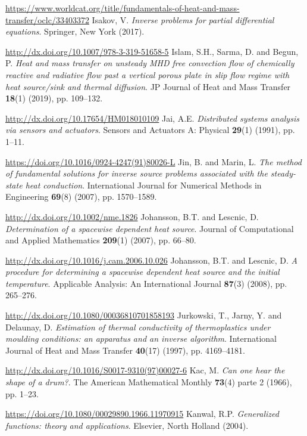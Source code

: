 \begin{thebibliography}{301}
\href{https://www.worldcat.org/title/fundamentals-of-heat-and-mass-transfer/oclc/33403372}{https://www.worldcat.org/title/fundamentals-of-heat-and-mass-transfer/oclc/33403372}
%
%
 Isakov, V. {\it Inverse problems for partial differential equations}. Springer, New York (2017).

\url{http://dx.doi.org/10.1007/978-3-319-51658-5}
%
%
 Islam, S.H., Sarma, D. and Begun, P. {\it Heat and mass transfer on unsteady MHD free convection flow of chemically reactive and radiative flow past a vertical porous plate in slip flow regime with heat source/sink and thermal diffusion}. JP Journal of Heat and Mass Transfer {\bf 18}(1) (2019), pp. 109--132.

\url{http://dx.doi.org/10.17654/HM018010109}
%
%
 Jai, A.E. {\it Distributed systems analysis via sensors and actuators}. Sensors and Actuators A: Physical {\bf 29}(1) (1991), pp. 1--11.

\url{https://doi.org/10.1016/0924-4247(91)80026-L}
%
%
 Jin, B. and Marin, L. {\it The method of fundamental solutions for inverse source problems associated with the steady-state heat conduction}. International Journal for Numerical Methods in Engineering {\bf 69}(8) (2007), pp. 1570--1589.

\url{http://dx.doi.org/10.1002/nme.1826}
%
%
 Johansson, B.T. and Lescnic, D. {\it Determination of a spacewise dependent heat source}. Journal of Computational and Applied Mathematics {\bf 209}(1) (2007), pp. 66--80.

\url{http://dx.doi.org/10.1016/j.cam.2006.10.026}
%
%
 Johansson, B.T. and Lescnic, D. {\it A procedure for determining a spacewise dependent heat source and the initial temperature}. Applicable Analysis: An International Journal {\bf 87}(3) (2008), pp. 265--276.

\url{http://dx.doi.org/10.1080/00036810701858193}
%
%
 Jurkowski, T., Jarny, Y. and Delaunay, D. {\it Estimation of thermal conductivity of thermoplastics under moulding conditions: an apparatus and an inverse algorithm}. International Journal of Heat and Mass Transfer {\bf 40}(17) (1997), pp. 4169--4181.

\url{http://dx.doi.org/10.1016/S0017-9310(97)00027-6}
%
%
 Kac, M. {\it Can one hear the shape of a drum?}. The American Mathematical Monthly {\bf 73}(4) parte 2 (1966), pp. 1--23.

\url{https://doi.org/10.1080/00029890.1966.11970915}
%
%
 Kanwal, R.P. {\it Generalized functions: theory and applications}. Elsevier, North Holland (2004). 


\end{thebibliography}
